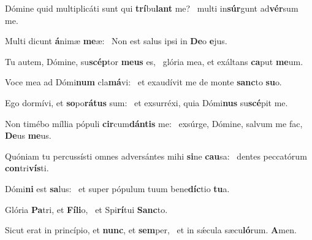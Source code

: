 \item Dómine quid multiplicáti sunt qui \textbf{trí}bu\textbf{lant} me?~\psstar{} multi in\textbf{súr}gunt ad\textbf{vér}sum me.
\item Multi dicunt \textbf{á}nimæ \textbf{me}æ:~\psstar{} Non est salus ipsi in \textbf{De}o \textbf{e}jus.
\item Tu autem, Dómine, su\textbf{scép}tor \textbf{me}\textbf{us} es,~\psstar{} glória mea, et exáltans \textbf{ca}put \textbf{me}um.
\item Voce mea ad Dómi\textbf{num} cla\textbf{má}vi:~\psstar{} et exaudívit me de monte \textbf{sanc}to \textbf{su}o.
\item Ego dormívi, et \textbf{so}po\textbf{rá}\textbf{tus} sum:~\psstar{} et exsurréxi, quia Dómi\textbf{nus} su\textbf{scé}pit me.
\item Non timébo míllia pópuli \textbf{cir}cum\textbf{dán}\textbf{tis} me:~\psstar{} exsúrge, Dómine, salvum me fac, \textbf{De}us \textbf{me}us.
\item Quóniam tu percussísti omnes adversántes mihi \textbf{si}ne \textbf{cau}sa:~\psstar{} dentes peccatórum \textbf{con}tri\textbf{vís}ti.
\item Dómi\textbf{ni} est \textbf{sa}lus:~\psstar{} et super pópulum tuum bene\textbf{díc}tio \textbf{tu}a.
\item Glória \textbf{Pa}tri, et \textbf{Fí}\textbf{li}o,~\psstar{} et Spi\textbf{rí}tui \textbf{Sanc}to.
\item Sicut erat in princípio, et \textbf{nunc}, et \textbf{sem}per,~\psstar{} et in sǽcula sæcu\textbf{ló}rum. \textbf{A}men.